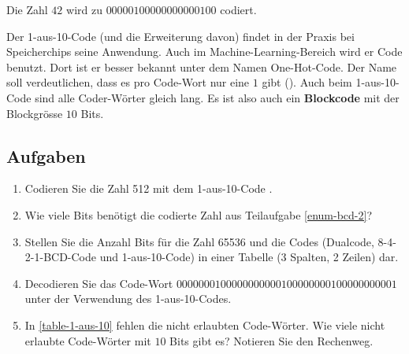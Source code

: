 \begin{example}
Die Zahl $42$ wird zu $00000100000000000100$ codiert.
\end{example}

Der 1-aus-10-Code (und die Erweiterung davon) findet in der Praxis bei Speicherchips seine Anwendung. Auch im Machine-Learning-Bereich wird er Code benutzt. Dort ist er besser bekannt unter dem Namen One-Hot-Code. Der Name soll verdeutlichen, dass es pro Code-Wort nur eine $1$ gibt (). Auch beim 1-aus-10-Code sind alle Coder-Wörter gleich lang. Es ist also auch ein \textbf{Blockcode} mit der Blockgrösse $10$ Bits.

\subsection{Aufgaben}
\label{subsection-bcd-1aus10-aufgaben}

\begin{enumerate}
\item Codieren Sie die Zahl \num{512} mit dem 1-aus-10-Code \label{enum-bcd-2}.
\fillwithgrid{0.5in}
\item Wie viele Bits benötigt die codierte Zahl aus Teilaufgabe \ref{enum-bcd-2}?
\fillwithgrid{0.25in}
\item Stellen Sie die Anzahl Bits für die Zahl \num{65536} und die Codes (Dualcode, 8-4-2-1-\ac{BCD}-Code und 1-aus-10-Code) in einer Tabelle (3 Spalten, 2 Zeilen) dar.
\fillwithgrid{1.75in}
\item Decodieren Sie das Code-Wort $0000000100000000000100000000100000000001$ unter der Verwendung des 1-aus-10-Codes.
\fillwithgrid{0.25in}
\item In \autoref{table-1-aus-10} fehlen die nicht erlaubten Code-Wörter. Wie viele nicht erlaubte Code-Wörter mit $10$ Bits gibt es? Notieren Sie den Rechenweg.
\fillwithgrid{0.75in}
\end{enumerate}
